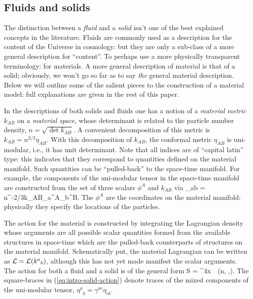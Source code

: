 \subsection{Fluids and solids}
The distinction between a \textit{fluid} and a \textit{solid} isn't one of the best explained concepts in the literature. Fluids are commonly used as a   description for the content of the Universe in cosmology: but they are only a sub-class of a more general description for ``content''. To perhaps use a  more physically transparent terminology: for materials. A more general  description of material is that of a solid; obviously, we won't go so far as to say \textit{the}  general material description. Below we will outline some of the salient pieces to the construction of a material model: full explanations are given in the rest of this paper.

In the descriptions of both solids and fluids  one has a notion of a \textit{material metric} $k_{AB}$ on a \textit{material space}, whose determinant is related to the particle number density, $n = \sqrt{\det k_{AB}}$. A convenient decomposition of this metric is $k_{AB} = n^{2/3}\eta_{AB}$. With this decomposition of   $k_{AB}$, the conformal metric $\eta_{AB}$ is uni-modular, i.e., it has unit determinant. Note that all indices are of ``capital latin'' type: this indicates that they correspond to quantities defined on the material manifold. Such quantities can be ``pulled-back'' to the space-time manifold. For example, the components of the uni-modular tensor in the space-time manifold are constructed from the set of three scalars $\phi^A$  and $k_{AB}$ via
\bea
\eta_{ab} = n^{-2/3}k_{AB}\partial_a\phi^A\partial_b\phi^B.
\eea
The $\phi^A$ are the coordinates on the material manifold: physically they specify the locations of the particles.

The action for the material is constructed by integrating the Lagrangian density whose arguments are all possible scalar quantities formed from the available structures in space-time which are the pulled-back counterparts of structures on the material manifold. Schematically put, the material Lagrangian can be written as $\mathcal{L} = \mathcal{L}({k^a}_b)$, although this has not yet made manifest the scalar arguments.
The action for both a fluid and a solid is of the general form 
\bea
\label{eq:intro-solid-action}
S = \int \dd^4x\, \, \ld\left(n, \left[ \gbm{\eta}\right],\left[\gbm{\eta}^2\right]\right).
\eea
The square-braces in (\ref{eq:intro-solid-action}) denote traces of the mixed components of the uni-modular tensor, ${\eta^a}_b = \gamma^{ac}\eta_{cb}$. 

